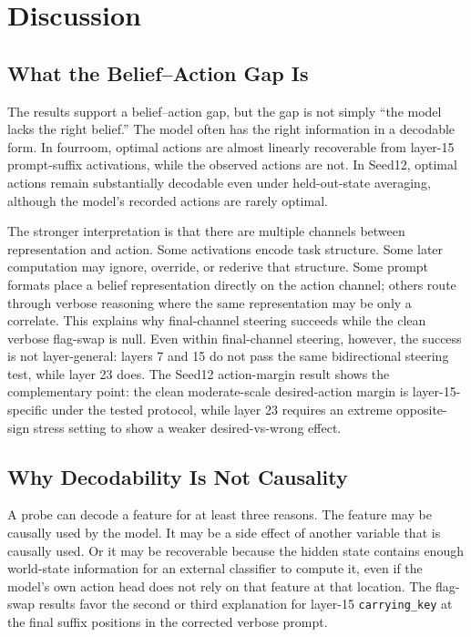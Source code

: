 \documentclass[11pt]{article}
\begin{document}
\FloatBarrier

\section{Discussion}

\subsection{What the Belief--Action Gap Is}

The results support a belief--action gap, but the gap is not simply ``the model lacks the right belief.''
The model often has the right information in a decodable form.
In fourroom, optimal actions are almost linearly recoverable from layer-15 prompt-suffix activations, while the observed actions are not.
In Seed12, optimal actions remain substantially decodable even under held-out-state averaging, although the model's recorded actions are rarely optimal.

The stronger interpretation is that there are multiple channels between representation and action.
Some activations encode task structure.
Some later computation may ignore, override, or rederive that structure.
Some prompt formats place a belief representation directly on the action channel; others route through verbose reasoning where the same representation may be only a correlate.
This explains why final-channel steering succeeds while the clean verbose flag-swap is null.
Even within final-channel steering, however, the success is not layer-general: layers 7 and 15 do not pass the same bidirectional steering test, while layer 23 does.
The Seed12 action-margin result shows the complementary point: the clean moderate-scale desired-action margin is layer-15-specific under the tested protocol, while layer 23 requires an extreme opposite-sign stress setting to show a weaker desired-vs-wrong effect.

\subsection{Why Decodability Is Not Causality}

A probe can decode a feature for at least three reasons.
The feature may be causally used by the model.
It may be a side effect of another variable that is causally used.
Or it may be recoverable because the hidden state contains enough world-state information for an external classifier to compute it, even if the model's own action head does not rely on that feature at that location.
The flag-swap results favor the second or third explanation for layer-15 \texttt{carrying\_key} at the final suffix positions in the corrected verbose prompt.
\end{document}
